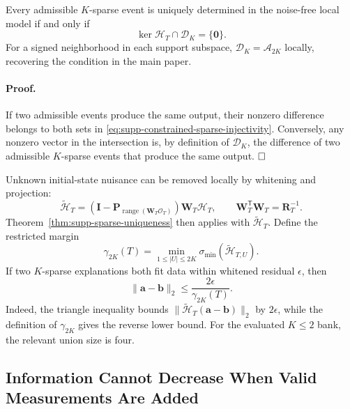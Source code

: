 \begin{theorem}
Every admissible $K$-sparse event is uniquely determined in the noise-free local model if and only if
\begin{equation}
 \ker\mathcal H_T\cap\mathcal D_K=\{\bm0\}.
 \label{eq:supp-constrained-sparse-injectivity}
\end{equation}
For a signed neighborhood in each support subspace, $\mathcal D_K=\mathcal A_{2K}$ locally, recovering the condition in the main paper.
\label{thm:supp-sparse-uniqueness}
\end{theorem}

\paragraph{Proof.}
If two admissible events produce the same output, their nonzero difference belongs to both sets in \eqref{eq:supp-constrained-sparse-injectivity}. Conversely, any nonzero vector in the intersection is, by definition of $\mathcal D_K$, the difference of two admissible $K$-sparse events that produce the same output. $\hfill\square$

Unknown initial-state nuisance can be removed locally by whitening and projection:
\begin{equation}
 \widetilde{\mathcal H}_T
 =\left(\bm I-\bm P_{\operatorname{range}(\bm W_T\mathcal O_T)}\right)
 \bm W_T\mathcal H_T,
 \qquad \bm W_T^{\mathsf T}\bm W_T=\bm R_T^{-1}.
 \label{eq:supp-projected-event-dictionary}
\end{equation}
Theorem~\ref{thm:supp-sparse-uniqueness} then applies with $\widetilde{\mathcal H}_T$. Define the restricted margin
\begin{equation}
 \gamma_{2K}(T)=
 \min_{1\le |U|\le2K}\sigma_{\min}
 (\widetilde{\mathcal H}_{T,U}).
 \label{eq:supp-restricted-margin}
\end{equation}
If two $K$-sparse explanations both fit data within whitened residual $\epsilon$, then
\begin{equation}
 \|\bm a-\bm b\|_2\le\frac{2\epsilon}{\gamma_{2K}(T)}.
 \label{eq:supp-stability-bound}
\end{equation}
Indeed, the triangle inequality bounds
$\|\widetilde{\mathcal H}_T(\bm a-\bm b)\|_2$ by $2\epsilon$, while the definition of $\gamma_{2K}$ gives the reverse lower bound. For the evaluated $K\le2$ bank, the relevant union size is four.

\subsection{Information Cannot Decrease When Valid Measurements Are Added}

